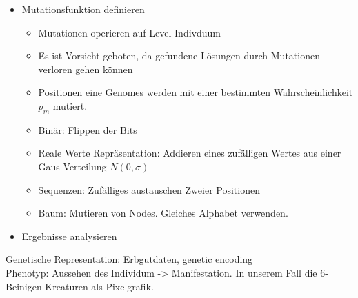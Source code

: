 \begin{itemize}
      \item Mutationsfunktion definieren
        \begin{itemize}
          \item Mutationen operieren auf Level Indivduum
          \item Es ist Vorsicht geboten, da gefundene Lösungen durch Mutationen verloren gehen können
          \item Positionen eine Genomes werden mit einer bestimmten Wahrscheinlichkeit \(p_{m}\) mutiert.
          \item Binär: Flippen der Bits
          \item Reale Werte Repräsentation: Addieren eines zufälligen Wertes aus einer Gaus Verteilung \(N(0,\sigma)\)
          \item Sequenzen: Zufälliges austauschen Zweier Positionen
          \item Baum: Mutieren von Nodes. Gleiches Alphabet verwenden.
        \end{itemize}

      \item Ergebnisse analysieren
    \end{itemize}

    Genetische Representation: Erbgutdaten, genetic encoding \\
    Phenotyp: Aussehen des Individum -> Manifestation. In unserem Fall die 6-Beinigen Kreaturen als Pixelgrafik. \\

